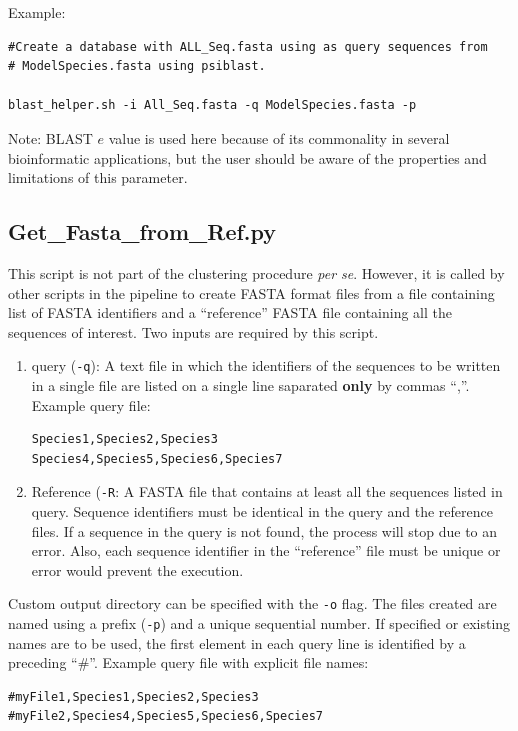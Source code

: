 \documentclass[10pt]{article}
\begin{document}
Example:
\begin{lstlisting}
#Create a database with ALL_Seq.fasta using as query sequences from
# ModelSpecies.fasta using psiblast.

blast_helper.sh -i All_Seq.fasta -q ModelSpecies.fasta -p
\end{lstlisting}



Note: BLAST $e$ value is used here because of its commonality in
several bioinformatic applications, but the user should be aware of the properties  and limitations of this parameter.


\subsection{Get\_Fasta\_from\_Ref.py}\label{sec:getfastafromref} This
script is not part of the clustering procedure \emph{per se}. However, it is
called by other scripts in the pipeline to create FASTA format files
from a file containing list of FASTA identifiers and a ``reference''
FASTA file containing all the sequences of interest. Two inputs are
required by this script.
\begin{enumerate}
\item query (\texttt{-q}): A text file in which the identifiers of
the sequences to be written in a single file are listed on a single
line saparated \textbf{only} by commas ``,''.  Example query file:
\begin{lstlisting} 
Species1,Species2,Species3
Species4,Species5,Species6,Species7
\end{lstlisting}
\item Reference (\texttt{-R}: A FASTA file that contains at least all
the sequences listed in query. Sequence identifiers must be identical
in the query and the reference files. If a sequence in the query is not
found, the process will stop due to an error. Also, each sequence
identifier in the ``reference'' file must be unique or error would
prevent the execution.
\end{enumerate}

Custom output directory can be specified with the \texttt{-o} flag.
The files created are named using a prefix (\texttt{-p}) and
a unique sequential number. If specified or existing names are to be
used, the first element in each query line is identified by a
preceding ``\#''.
Example query file with explicit file names:
\begin{lstlisting} 
#myFile1,Species1,Species2,Species3
#myFile2,Species4,Species5,Species6,Species7
\end{lstlisting}
\end{document}
